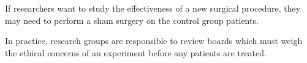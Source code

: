 \documentclass{beamer}
\begin{document}
\begin{frame}
\begin{example}
If researchers want to study the effectiveness of a new surgical procedure, they may need to perform a sham surgery on the control group patients.\pause

\vspace{1mm}
\pause
{}
\end{example}\pause

\begin{note}
In practice, research groups are responsible to review boards which must weigh the ethical concerns of an experiment before any patients are treated. 
\end{note}
\end{frame}
\end{document}
